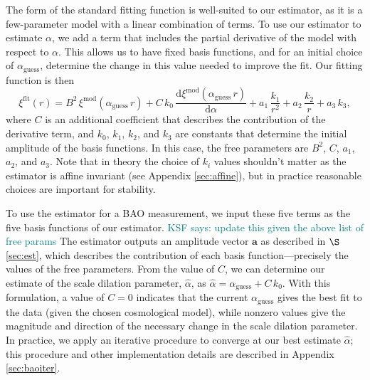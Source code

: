 \documentclass[modern]{aastex62}
\newcommand{\dd}{\mathrm{d}}
\newcommand{\bld}[1]{\bm{#1}} %
\newcommand{\KSF}[1]{\textcolor{teal}{KSF says: #1}}
\begin{document}
The form of the standard fitting function is well-suited to our estimator, as it is a few-parameter model with a linear combination of terms.
To use our estimator to estimate $\alpha$, we add a term that includes the partial derivative of the model with respect to $\alpha$.
This allows us to have fixed basis functions, and for an initial choice of $\alpha_\mathrm{guess}$, determine the change in this value needed to improve the fit. 
Our fitting function is then
\begin{equation} \label{eq:baoiter_fit}
\xi^\mathrm{fit}(r) = B^2\,\xi^\mathrm{mod}(\alpha_\mathrm{guess}\,r) + C\,k_0\,\frac{\dd \xi^\mathrm{mod}(\alpha_\mathrm{guess}\,r)}{\dd \alpha} + a_1\,\frac{k_1}{r^2} + a_2\,\frac{k_2}{r} + a_3\,k_3 ,
\end{equation}
where $C$ is an additional coefficient that describes the contribution of the derivative term, and $k_0$, $k_1$, $k_2$, and $k_3$ are constants that determine the initial amplitude of the basis functions.
In this case, the free parameters are $B^2$, $C$, $a_1$, $a_2$, and $a_3$.
Note that in theory the choice of $k_i$ values shouldn't matter as the estimator is affine invariant (see Appendix \ref{sec:affine}), but in practice reasonable choices are important for stability.

To use the estimator for a BAO measurement, we input these five terms as the five basis functions of our estimator.
\KSF{update this given the above list of free params}
The estimator outputs an amplitude vector $\bld{a}$ as described in $\S$\ref{sec:est}, which describes the contribution of each basis function---precisely the values of the free parameters.
From the value of $C$, we can determine our estimate of the scale dilation parameter, $\hat{\alpha}$, as $\hat{\alpha} = \alpha_\mathrm{guess} + C\,k_0$. 
With this formulation, a value of $C=0$ indicates that the current $\alpha_\mathrm{guess}$ gives the best fit to the data (given the chosen cosmological model), while nonzero values give the magnitude and direction of the necessary change in the scale dilation parameter.
In practice, we apply an iterative procedure to converge at our best estimate $\hat{\alpha}$; this procedure and other implementation details are described in Appendix \ref{sec:baoiter}.
\end{document}
